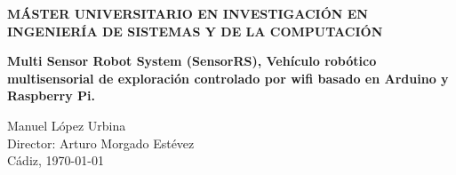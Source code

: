\begin{titlepage}
\begin{center}
    \Large{\textbf{MÁSTER UNIVERSITARIO EN INVESTIGACIÓN EN INGENIERÍA DE SISTEMAS Y DE LA COMPUTACIÓN}} \\

    \vspace{3.0cm}

    \Large{\textbf{ Multi Sensor Robot System (SensorRS), Vehículo robótico multisensorial de exploración controlado por wifi basado en Arduino y Raspberry Pi. }} \\

    \vspace{3.0cm}

    \normalsize{Manuel López Urbina \\
    Director: Arturo Morgado Estévez }\\

    \vspace{1.5cm}
    Cádiz, \today

  \end{center}
\end{titlepage}


